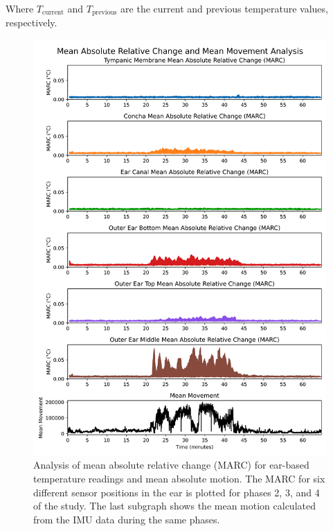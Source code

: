 Where \( T_{\text{current}} \) and \( T_{\text{previous}} \) are the current and previous temperature values, respectively. 
\begin{figure}[!t]
    \centering
    \includegraphics[width=\textwidth]{thesis-doc/images/study1/hypothesis5/Hypothesis5_Analysis.png}
    \caption{Analysis of mean absolute relative change (MARC) for ear-based temperature readings and mean absolute motion. The MARC for six different sensor positions in the ear is plotted for phases 2, 3, and 4 of the study. The last subgraph shows the mean motion calculated from the IMU data during the same phases.}    
    \label{fig:eval:study1:hypothesis5_result}
\end{figure} 

